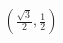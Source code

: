 \documentclass[preview]{standalone}
\begin{document}
\begin{align*}
(\frac{\sqrt{3}}{2}, \frac{1}{2})
\end{align*}
\end{document}
